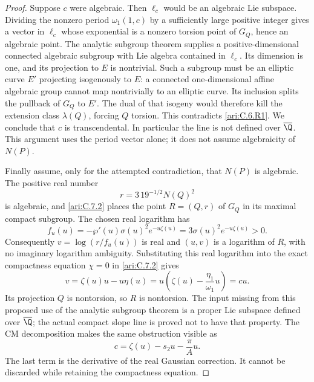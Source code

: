 \begin{proof}
Suppose $c$ were algebraic. Then $\ell_c$ would be an
algebraic Lie subspace. Dividing the nonzero period
$\omega_1(1,c)$ by a sufficiently large positive integer
gives a vector in $\ell_c$ whose exponential is a nonzero
torsion point of $G_Q$, hence an algebraic point. The
analytic subgroup theorem
\citep[Theorem 6.1]{huber2022} supplies a positive-dimensional
connected algebraic subgroup with Lie algebra contained in
$\ell_c$. Its dimension is one, and its projection to $E$
is nontrivial. Such a subgroup must be an elliptic curve
$E'$ projecting isogenously to $E$: a connected
one-dimensional affine algebraic group cannot map
nontrivially to an elliptic curve. Its inclusion splits the
pullback of $G_Q$ to $E'$. The dual of that isogeny would
therefore kill the extension class $\lambda(Q)$, forcing
$Q$ torsion. This contradicts \ref{ari:C.6.R1}. We conclude that $c$
is transcendental. In particular the line is not defined over
$\overline\Q$. This argument uses the period vector alone;
it does not assume algebraicity of $N(P)$.

Finally assume, only for the attempted contradiction, that
$N(P)$ is algebraic. The positive real number
\[
 r=3\,19^{-1/2}N(Q)^2
\]
is algebraic, and \ref{ari:C.7.2} places the point $R=(Q,r)$ of
$G_Q$ in its maximal compact subgroup. The chosen real
logarithm has
\[
 f_u(u)=-\wp'(u)\sigma(u)^2e^{-u\zeta(u)}
        =3\sigma(u)^2e^{-u\zeta(u)}>0.
\]
Consequently $v=\log(r/f_u(u))$ is real and
$(u,v)$ is a logarithm of $R$, with no imaginary logarithm
ambiguity. Substituting this real logarithm into the exact
compactness equation $\chi=0$ in \ref{ari:C.7.2} gives
\[
 v=\zeta(u)u-u\eta(u)
   =u\left(\zeta(u)-\frac{\eta_1}{\omega_1}u\right)=cu.
\]
Its projection $Q$ is nontorsion, so $R$ is nontorsion.
The input missing from this proposed use of the analytic
subgroup theorem is a proper Lie subspace defined over
$\overline\Q$; the actual compact slope line is proved
not to have that property. The CM decomposition makes the
same obstruction visible as
\[
 c=\zeta(u)-s_2u-\frac{\pi}{A}u.
\]
The last term is the derivative of the real Gaussian
correction. It cannot be discarded while retaining the
compactness equation.
\end{proof}

